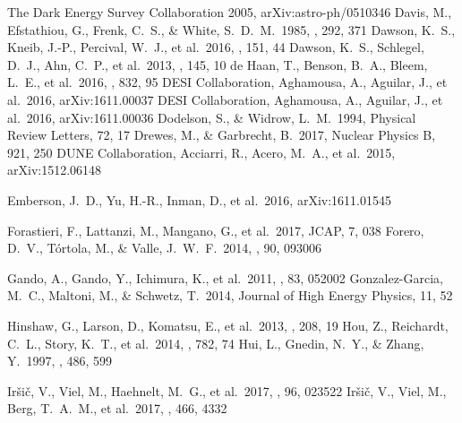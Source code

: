 \documentclass{emulateapj}
\begin{document}
\begin{thebibliography}{}
 The Dark Energy Survey Collaboration 2005, arXiv:astro-ph/0510346 
 Davis, M., Efstathiou, G., Frenk, C.~S., \& White, S.~D.~M.\ 1985, \apj, 292, 371 
 Dawson, K.~S., Kneib, J.-P., Percival, W.~J., et al.\ 2016, \aj, 151, 44 
 Dawson, K.~S., Schlegel, D.~J., Ahn, C.~P., et al.\ 2013, \aj, 145, 10 
 de Haan, T., Benson, B.~A., Bleem, L.~E., et al.\ 2016, \apj, 832, 95 
 DESI Collaboration, Aghamousa, A., Aguilar, J., et al.\ 2016, arXiv:1611.00037 
 DESI Collaboration, Aghamousa, A., Aguilar, J., et al.\ 2016, arXiv:1611.00036 
 Dodelson, S., \& Widrow, L.~M.\ 1994, Physical Review Letters, 72, 17 
 Drewes, M., \& Garbrecht, B.\ 2017, Nuclear Physics B, 921, 250 
 DUNE Collaboration, Acciarri, R., Acero, M.~A., et al.\ 2015, arXiv:1512.06148

 Emberson, J.~D., Yu, H.-R., Inman, D., et al.\ 2016, arXiv:1611.01545 

 Forastieri, F., Lattanzi, M., Mangano, G., et al.\ 2017, JCAP, 7, 038 
 Forero, D.~V., T{\'o}rtola, M., \& Valle, J.~W.~F.\ 2014, \prd, 90, 093006 


 Gando, A., Gando, Y., Ichimura, K., et al.\ 2011, \prd, 83, 052002
 Gonzalez-Garcia, M.~C., Maltoni, M., \& Schwetz, T.\ 2014, Journal of High Energy Physics, 11, 52 


 Hinshaw, G., Larson, D., Komatsu, E., et al.\ 2013, \apjs, 208, 19
 Hou, Z., Reichardt, C.~L., Story, K.~T., et al.\ 2014, \apj, 782, 74
 Hui, L., Gnedin, N.~Y., \& Zhang, Y.\ 1997, \apj, 486, 599
 
 Ir{\v s}i{\v c}, V., Viel, M., Haehnelt, M.~G., et al.\ 2017, \prd, 96, 023522 
 Ir{\v s}i{\v c}, V., Viel, M., Berg, T.~A.~M., et al.\ 2017, \mnras, 466, 4332 


\end{thebibliography}
\end{document}
